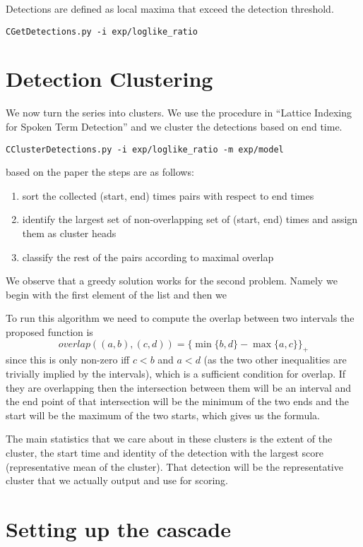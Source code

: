 \documentclass{article}
\begin{document}
Detections are defined as local maxima that exceed the detection
threshold.
\begin{verbatim}
CGetDetections.py -i exp/loglike_ratio
\end{verbatim}


\section{Detection Clustering}

We now turn the series into clusters.  We use the procedure
in ``Lattice Indexing for Spoken Term Detection''
and we cluster the detections based on end time.
\begin{verbatim}
CClusterDetections.py -i exp/loglike_ratio -m exp/model
\end{verbatim}
based on the paper the steps are as follows:
\begin{enumerate}
\item sort the collected (start, end) times pairs with respect to end times
\item identify the largest set of non-overlapping set of (start, end) times and assign them as cluster heads
\item classify the rest of the pairs according to maximal overlap
\end{enumerate}
We observe that a greedy solution works for the second problem.  Namely
we begin with the first element of the list and then we

To run this algorithm we need to compute the overlap between two
intervals
the proposed function is
\begin{equation}
  overlap((a,b),(c,d)) = \{\min\{b,d\} - \max\{a,c\}\}_+
\end{equation}
since this is only non-zero iff $c<b$ and $a<d$ (as the two other
inequalities are trivially implied by the intervals), which is a 
sufficient condition for overlap.  If they are overlapping then
the intersection between them will be an interval and the end
point of that intersection will be the minimum of the two ends
and the start will be the maximum of the two starts, which gives
us the formula.

The main statistics that we care about in these clusters is the extent of the cluster, the start time and identity of the detection with the largest score (representative mean of the cluster).  That
detection will be the representative cluster that we actually
output and use for scoring.

\section{Setting up the cascade}
\end{document}

